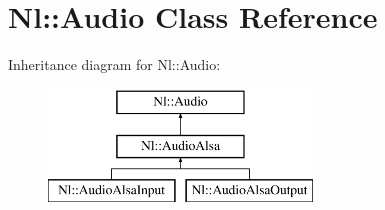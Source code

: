 \hypertarget{classNl_1_1Audio}{}\section{Nl\+:\+:Audio Class Reference}
\label{classNl_1_1Audio}
Inheritance diagram for Nl\+:\+:Audio\+:\begin{figure}[H]
\begin{center}
\leavevmode
\includegraphics[height=3.000000cm]{classNl_1_1Audio}
\end{center}
\end{figure}
